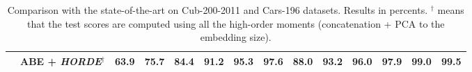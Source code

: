\documentclass[10pt,twocolumn,letterpaper]{article}
\def\ourmethod{\textit{HORDE}}
\begin{document}
\begin{table*}[t!]
\begin{center}
\begin{tabular}{|c|c|cccccc|cccccc|}
                 & ABE + \ourmethod{$^\dag$} & \textbf{63.9} & \textbf{75.7} &\textbf{84.4} & \textbf{91.2} & \textbf{95.3} & \textbf{97.6} & \textbf{88.0} & \textbf{93.2 }& \textbf{96.0} & \textbf{97.9} &\textbf{ 99.0} & \textbf{99.5} \\
                \hline
            \end{tabular}
            \caption{Comparison with the state-of-the-art on Cub-200-2011 and Cars-196 datasets. Results in percents. {$^\dag$} means that the test scores are computed using all the high-order moments (concatenation + PCA to the embedding size).}
            \label{tab:CUB-CARS}
        \end{center}
        \vspace{-1em}
    \end{table*}
    
\end{document}
